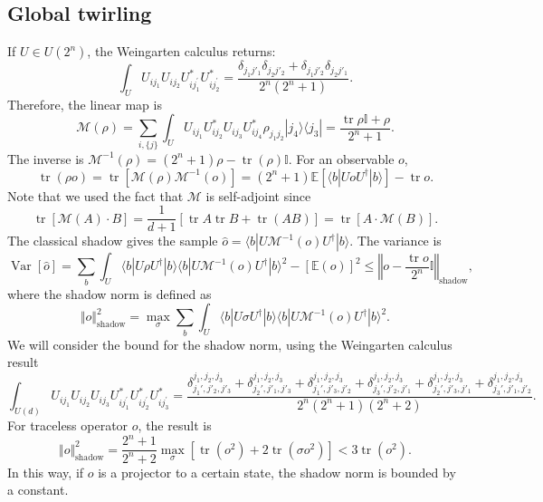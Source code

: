 \documentclass[aps,prb,superscriptaddress,nofootinbib]{revtex4}
\def \tr{\operatorname{tr}}
\begin{document}
\subsection{Global twirling}
If $U \in U(2^n)$, the Weingarten calculus returns:
\begin{equation}
	\int_{U} U_{i j_1} U_{i j_2} U_{i j_1^{\prime}}^* U_{i j_2^{\prime}}^* 
	= \frac{\delta_{j_1 j'_1}\delta_{j_2 j'_2} + 
		\delta_{j_1 j'_2}\delta_{j_2 j'_1}}{2^n(2^n+1)}.
\end{equation}
Therefore, the linear map is
\begin{equation}
	\mathcal{M}(\rho) 
= \sum_{i,\{j\}} \int_{U}  U_{i j_1}U^*_{i j_2} U_{i j_3}U^*_{i j_4}  \rho_{j_1j_2} |j_4\rangle\langle j_3| 
= \frac{\tr\rho\mathbb I+\rho}{2^n+1}.
\end{equation}
The inverse is $\mathcal{M}^{-1}(\rho) = (2^n+1)\rho - \tr(\rho)\mathbb{I}$.
For an observable $o$,
\begin{equation}
	\tr(\rho o) = \tr[\mathcal{M}(\rho)\mathcal{M}^{-1}(o)]
	= (2^n+1)\mathbb{E}\left[\langle b| U o U^\dagger |b\rangle\right] - \tr o.
\end{equation}
Note that we used the fact that $\mathcal M$ is self-adjoint since
\begin{equation*}
	\tr\left[\mathcal{M}(A)\cdot B\right] 
	= \frac{1}{d+1}\left[\tr A \tr B + \tr(AB)\right]
	= \tr\left[A\cdot\mathcal{M}(B)\right].
\end{equation*}
The classical shadow gives the sample $\hat o = \langle b|U \mathcal{M}^{-1}(o) U^\dagger|b\rangle$. The variance is
\begin{equation}
	\operatorname{Var}[\hat o] = \sum_b \int_U \langle b|U \rho U^\dagger|b\rangle 
	\langle b|U \mathcal{M}^{-1}(o) U^\dagger|b\rangle^2-[\mathbb{E}(o)]^2
	\le \left\Vert o - \frac{\tr o}{2^n}\mathbb I \right\Vert_\text{shadow},
\end{equation}
where the shadow norm is defined as
\begin{equation}
	\Vert o \Vert_\text{shadow}^2 = \max_{\sigma}\sum_b \int_U \langle b|U \sigma U^\dagger|b\rangle \langle b|U \mathcal{M}^{-1}(o) U^\dagger|b\rangle^2.
\end{equation}
We will consider the bound for the shadow norm, using the Weingarten calculus result
\begin{equation}
	\int_{U(d)} U_{i j_1} U_{i j_2}U_{i j_3} U_{i j_1^{\prime}}^* U_{i j_2^{\prime}}^* U_{i j_3^{\prime}}^* 
	= \frac{
	\delta^{j_1,j_2,j_3}_{j_1',j'_2,j'_3} + \delta^{j_1,j_2,j_3}_{j_2',j'_1,j'_3} +
	\delta^{j_1,j_2,j_3}_{j_1',j'_3,j'_2} + \delta^{j_1,j_2,j_3}_{j_3',j'_2,j'_1} +
	\delta^{j_1,j_2,j_3}_{j_2',j'_3,j'_1} +	\delta^{j_1,j_2,j_3}_{j_3',j'_1,j'_2}
	}{2^n(2^n+1)(2^n+2)}.
\end{equation}
For traceless operator $o$, the result is
\begin{equation}
	\Vert o \Vert_\text{shadow}^2 = \frac{2^n+1}{2^n+2}\max_{\sigma} \left[\tr(o^2)+2 \tr(\sigma o^2) \right] < 3 \tr(o^2).
\end{equation}
In this way, if $o$ is a projector to a certain state, the shadow norm is bounded by a constant.
\end{document}
